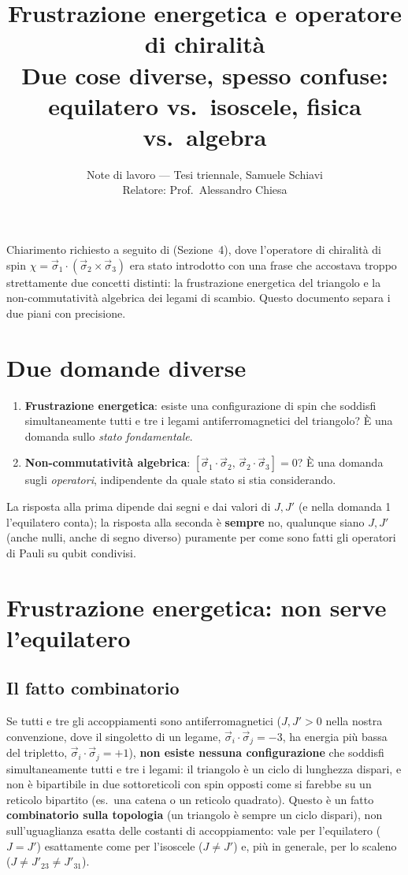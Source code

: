 \documentclass[11pt,a4paper]{article}
\title{\vspace{-1.5em}\color{inkblue}Frustrazione energetica e operatore di chiralità\\[0.1em]\Large\normalfont\color{softgray}Due cose diverse, spesso confuse: equilatero vs.\ isoscele, fisica vs.\ algebra}
\author{Note di lavoro --- Tesi triennale, Samuele Schiavi\\ Relatore: Prof.\ Alessandro Chiesa}
\date{}
\begin{document}
\sloppy
\maketitle
\thispagestyle{fancy}
\vspace{-2em}

Chiarimento richiesto a seguito di
\texttt{}
(Sezione~4), dove l'operatore di chiralità di spin
$\chi=\vec\sigma_1\cdot(\vec\sigma_2\times\vec\sigma_3)$ era stato
introdotto con una frase che accostava troppo strettamente due concetti
distinti: la frustrazione energetica del triangolo e la non-commutatività
algebrica dei legami di scambio. Questo documento separa i due piani con
precisione.

\section{Due domande diverse}

\begin{enumerate}[leftmargin=1.4em,itemsep=0.3em]
\item \textbf{Frustrazione energetica}: esiste una configurazione di spin
che soddisfi simultaneamente tutti e tre i legami antiferromagnetici del
triangolo? È una domanda sullo \emph{stato fondamentale}.
\item \textbf{Non-commutatività algebrica}: $[\vec\sigma_1\cdot\vec\sigma_2,\,\vec\sigma_2\cdot\vec\sigma_3]=0$?
È una domanda sugli \emph{operatori}, indipendente da quale stato si stia
considerando.
\end{enumerate}

La risposta alla prima dipende dai segni e dai valori di $J,J'$ (e nella
domanda 1 l'equilatero conta); la risposta alla seconda è \textbf{sempre}
no, qualunque siano $J,J'$ (anche nulli, anche di segno diverso)
puramente per come sono fatti gli operatori di Pauli su qubit condivisi.

\section{Frustrazione energetica: non serve l'equilatero}

\subsection{Il fatto combinatorio}

Se tutti e tre gli accoppiamenti sono antiferromagnetici ($J,J'>0$ nella
nostra convenzione, dove il singoletto di un legame, $\vec\sigma_i\cdot\vec\sigma_j=-3$,
ha energia più bassa del tripletto, $\vec\sigma_i\cdot\vec\sigma_j=+1$),
\textbf{non esiste nessuna configurazione} che soddisfi
simultaneamente tutti e tre i legami: il triangolo è un ciclo di lunghezza
dispari, e non è bipartibile in due sottoreticoli con spin opposti come
si farebbe su un reticolo bipartito (es.\ una catena o un reticolo
quadrato). Questo è un fatto \textbf{combinatorio sulla topologia} (un
triangolo è sempre un ciclo dispari), non sull'uguaglianza esatta delle
costanti di accoppiamento: vale per l'equilatero ($J=J'$) esattamente come
per l'isoscele ($J\neq J'$) e, più in generale, per lo scaleno
($J\neq J'_{23}\neq J'_{31}$).
\end{document}
